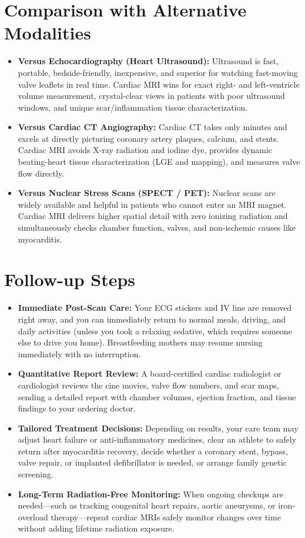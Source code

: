 \section{Comparison with Alternative Modalities}
\begin{itemize}
\item \textbf{Versus Echocardiography (Heart Ultrasound):} Ultrasound is fast, portable, bedside-friendly, inexpensive, and superior for watching fast-moving valve leaflets in real time. Cardiac MRI wins for exact right- and left-ventricle volume measurement, crystal-clear views in patients with poor ultrasound windows, and unique scar/inflammation tissue characterization.
\item \textbf{Versus Cardiac CT Angiography:} Cardiac CT takes only minutes and excels at directly picturing coronary artery plaques, calcium, and stents. Cardiac MRI avoids X-ray radiation and iodine dye, provides dynamic beating-heart tissue characterization (LGE and mapping), and measures valve flow directly.
\item \textbf{Versus Nuclear Stress Scans (SPECT / PET):} Nuclear scans are widely available and helpful in patients who cannot enter an MRI magnet. Cardiac MRI delivers higher spatial detail with zero ionizing radiation and simultaneously checks chamber function, valves, and non-ischemic causes like myocarditis.
\end{itemize}

\section{Follow-up Steps}
\begin{itemize}
\item \textbf{Immediate Post-Scan Care:} Your ECG stickers and IV line are removed right away, and you can immediately return to normal meals, driving, and daily activities (unless you took a relaxing sedative, which requires someone else to drive you home). Breastfeeding mothers may resume nursing immediately with no interruption.
\item \textbf{Quantitative Report Review:} A board-certified cardiac radiologist or cardiologist reviews the cine movies, valve flow numbers, and scar maps, sending a detailed report with chamber volumes, ejection fraction, and tissue findings to your ordering doctor.
\item \textbf{Tailored Treatment Decisions:} Depending on results, your care team may adjust heart failure or anti-inflammatory medicines, clear an athlete to safely return after myocarditis recovery, decide whether a coronary stent, bypass, valve repair, or implanted defibrillator is needed, or arrange family genetic screening.
\item \textbf{Long-Term Radiation-Free Monitoring:} When ongoing checkups are needed---such as tracking congenital heart repairs, aortic aneurysms, or iron-overload therapy---repeat cardiac MRIs safely monitor changes over time without adding lifetime radiation exposure.
\end{itemize}

